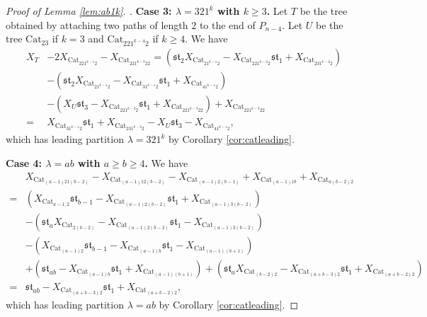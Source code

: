 \documentclass[10pt,a4paper]{amsart}
\begin{document}
\begin{proof}[Proof of Lemma \ref{lem:ab1k}. ]
\textbf{Case 3: $\lambda=321^k$ with $k\geq 3$. } Let $T$ be the tree obtained by attaching two paths of length $2$ to the end of $P_{n-4}$. Let $U$ be the tree $\text{Cat}_{23}$ if $k=3$ and $\text{Cat}_{221^{k-4}2}$ if $k\geq 4$. We have
\begin{align*}
X_T&-2X_{\text{Cat}_{221^{k-1}2}}-X_{\text{Cat}_{221^{k-3}22}}=(\mathfrak{st}_2X_{\text{Cat}_{21^{k-1}2}}-X_{\text{Cat}_{221^{k-2}2}}\mathfrak{st}_1+X_{\text{Cat}_{231^{k-2}2}})\\&-(\mathfrak{st}_2X_{\text{Cat}_{21^{k-1}2}}-X_{\text{Cat}_{31^{k-1}2}}\mathfrak{st}_1+X_{\text{Cat}_{41^{k-1}2}})\\&-(X_U\mathfrak{st}_3-X_{\text{Cat}_{221^{k-2}2}}\mathfrak{st}_1+X_{\text{Cat}_{221^{k-3}22}})+X_{\text{Cat}_{221^{k-3}22}}\\=&X_{\text{Cat}_{31^{k-1}2}}\mathfrak{st}_1+X_{\text{Cat}_{231^{k-2}2}}-X_U\mathfrak{st}_3-X_{\text{Cat}_{41^{k-1}2}},
\end{align*}
which has leading partition $\lambda=321^k$ by Corollary \ref{cor:catleading}.

\textbf{Case 4: $\lambda=ab$ with $a\geq b\geq 4$. }We have
\begin{align*}
&X_{\text{Cat}_{(a-1)21(b-2)}}-X_{\text{Cat}_{(a-1)12(b-2)}}-X_{\text{Cat}_{(a-1)2(b-1)}}+X_{\text{Cat}_{(a-1)1b}}+X_{\text{Cat}_{a(b-2)2}}\\=&(X_{\text{Cat}_{a-1,2}}\mathfrak{st}_{b-1}-X_{\text{Cat}_{(a-1)2(b-2)}}\mathfrak{st}_1+X_{\text{Cat}_{(a-1)3(b-2)}})\\&-(\mathfrak{st}_aX_{\text{Cat}_{2(b-2)}}-X_{\text{Cat}_{(a-1)2(b-2)}}\mathfrak{st}_1-X_{\text{Cat}_{(a-1)3(b-2)}})\\&-(X_{\text{Cat}_{(a-1)2}}\mathfrak{st}_{b-1}-X_{\text{Cat}_{(a-1)b}}\mathfrak{st}_1-X_{\text{Cat}_{(a-1)(b+1)}})\\&+(\mathfrak{st}_{ab}-X_{\text{Cat}_{(a-1)b}}\mathfrak{st}_1+X_{\text{Cat}_{(a-1)(b+1)}})+(\mathfrak{st}_aX_{\text{Cat}_{(b-2)2}}-X_{\text{Cat}_{(a+b-3)2}}\mathfrak{st}_1+X_{\text{Cat}_{(a+b-2)2}})\\=&\mathfrak{st}_{ab}-X_{\text{Cat}_{(a+b-3)2}}\mathfrak{st}_1+X_{\text{Cat}_{(a+b-2)2}},
\end{align*}
which has leading partition $\lambda=ab$ by Corollary \ref{cor:catleading}.


\end{proof}
\end{document}
